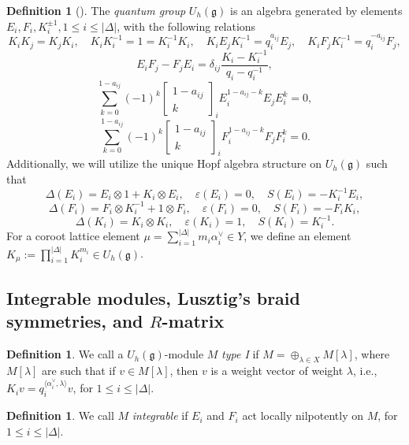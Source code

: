\documentclass[10pt]{amsart}
\numberwithin{equation}{section}
\theoremstyle{definition}
\newtheorem{definition}[theorem]{Definition}
\newcommand{\ot}{\otimes}
\newcommand{\ep}{\varepsilon}
\newcommand{\qbinom}[2]{\begin{bmatrix} #1 \\ #2 \end{bmatrix}}
\newcommand{\g}{\mathfrak{g}}
\begin{document}
\begin{definition}[\cite{JantzenQgps,Lus4}]\label{Quantum_group}
    The \emph{quantum group} $U_{h}(\mathfrak{g})$ is an algebra generated by elements $E_i,F_i, K_i^{\pm 1}, 1\le i \le |\Delta|$, with the following relations
    \[
    K_iK_j=K_jK_i, \quad K_iK_i^{-1} = 1= K_{i}^{-1}K_i, \quad K_i E_j K_i^{-1}=q^{a_{ij}}_i E_j, \quad K_i F_j K_i^{-1} = q^{-a_{ij}}_iF_j,
    \]
    \[
    E_iF_j-F_jE_i=\delta_{ij}\frac{K_i-K_i^{-1}}{q_i-q_i^{-1}},
    \]
    \[
    \sum_{k=0}^{1-a_{ij}}(-1)^k \qbinom{1-a_{ij}}{k}_i E_i^{1-a_{ij}-k}E_j E_i^k=0,
    \]
    \[
    \sum_{k=0}^{1-a_{ij}}(-1)^k \qbinom{1-a_{ij}}{k}_i F_i^{1-a_{ij}-k}F_j F_i^k=0.
    \]
    Additionally, we will utilize the unique Hopf algebra structure on $U_h(\mathfrak{g})$ such that
    \begin{equation*}
        \Delta(E_i)=E_i \ot 1+ K_i\ot E_i, \quad \ep(E_i)=0, \quad S(E_i)=-K_i^{-1}E_i,
    \end{equation*}
    \begin{equation*}
        \Delta(F_i)=F_i \ot K_i^{-1}+ 1\ot F_i, \quad \ep(F_i)=0, \quad S(F_i)=-F_iK_i,
    \end{equation*}
    \begin{equation*}
        \Delta(K_i)=K_i\otimes K_i, \quad \ep(K_i)=1, \quad S(K_i)=K_i^{-1}.
    \end{equation*}
     For a coroot lattice element $\mu=\sum_{i=1}^{|\Delta|}m_i \alpha_i^{\vee}\in Y$, we define an element $K_{\mu}:=\prod_{i=1}^{|\Delta|} K_{i}^{m_i} \in U_{h}(\g)$.
\end{definition}

\subsection{Integrable modules, Lusztig's braid symmetries, and $R$-matrix}

\begin{definition}
    We call a $U_h(\mathfrak{g})$-module $M$ \emph{type I} if $M=\oplus_{\lambda\in X} M[\lambda]$, where $M[\lambda]$ are such that if $v\in M[\lambda]$, then $v$ is a weight vector of weight $\lambda$, i.e., $K_i v=q_i^{\langle \alpha_i^{\vee},\lambda\rangle}v$, for $1\le i \le |\Delta|$. 
\end{definition}

\begin{definition}
    We call $M$ \emph{integrable} if $E_i$ and $F_i$ act locally nilpotently on $M$, for $1\le i\le |\Delta|$.
\end{definition}
\end{document}
